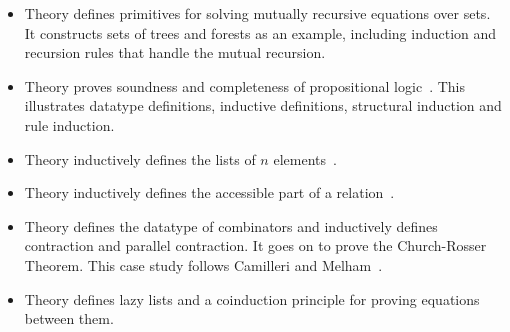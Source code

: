 \begin{itemize}
\item Theory  defines primitives for solving mutually
  recursive equations over sets.  It constructs sets of trees and forests
  as an example, including induction and recursion rules that handle the
  mutual recursion.

\item Theory  proves soundness and completeness of
  propositional logic~\cite{paulson-set-II}.  This illustrates datatype
  definitions, inductive definitions, structural induction and rule
  induction.

\item Theory  inductively defines the lists of $n$
  elements~\cite{paulin-tlca}.

\item Theory  inductively defines the accessible part of a
  relation~\cite{paulin-tlca}.

\item Theory  defines the datatype of combinators and
  inductively defines contraction and parallel contraction.  It goes on to
  prove the Church-Rosser Theorem.  This case study follows Camilleri and
  Melham~\cite{camilleri92}.

\item Theory  defines lazy lists and a coinduction
  principle for proving equations between them.
\end{itemize}


